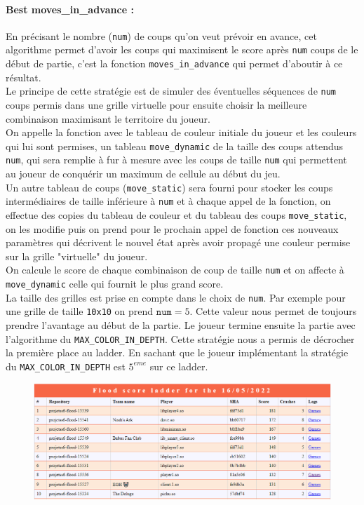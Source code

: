 \documentclass[11pt]{article}
\begin{document}
\paragraph{Best moves\_in\_advance : \\}
En précisant le nombre (\texttt{num}) de coups qu'on veut prévoir en avance, cet algorithme permet d'avoir les coups qui maximisent le score après \texttt{num} coups de le début de partie, c'est la fonction \texttt{moves\_in\_advance} qui permet d'aboutir à ce résultat.\\
Le principe de cette stratégie est de simuler des éventuelles séquences de \texttt{num} coups permis dans une grille virtuelle pour ensuite choisir la meilleure combinaison maximisant le territoire du joueur.\\
On appelle la fonction avec le tableau de couleur initiale du joueur et les couleurs qui lui sont permises, un tableau \texttt{move\_dynamic} de la taille des coups attendus \texttt{num}, qui sera remplie à fur à mesure avec les coups de taille \texttt{num} qui permettent au joueur de conquérir un maximum de cellule au début du jeu. \\
Un autre tableau de coups (\texttt{move\_static}) sera fourni pour stocker les coups intermédiaires de taille inférieure à \texttt{num} et à chaque appel de la fonction, on effectue des copies du tableau de couleur et du tableau des coups \texttt{move\_static}, on les modifie puis on prend pour le prochain appel de fonction ces nouveaux paramètres qui décrivent le nouvel état après avoir propagé une couleur permise sur la grille "virtuelle" du joueur.\\

On calcule le score de chaque combinaison de coup de taille \texttt{num} et on affecte à \texttt{move\_dynamic} celle qui fournit le plus grand score.\\
La taille des grilles est prise en compte dans le choix de \texttt{num}. Par exemple pour une grille de taille \texttt{10x10} on prend $\texttt{num}=5$. Cette valeur nous permet de toujours prendre l'avantage au début de la partie. Le joueur termine ensuite la partie avec l'algorithme du \texttt{MAX\_COLOR\_IN\_DEPTH}. Cette stratégie nous a permis de décrocher la première place au ladder. En sachant que le joueur implémentant la stratégie du \texttt{MAX\_COLOR\_IN\_DEPTH} est $5^{eme}$ sur ce ladder.

\begin{figure}[h!]
\begin{center}
\includegraphics[scale=0.45]{./img/ladder.PNG}
\end{center}
\end{figure}
\end{document}

